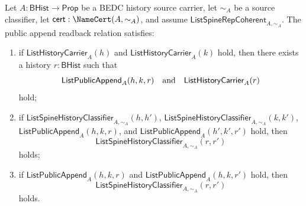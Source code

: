 \begin{theorem}
\label{thm:list-public-append-readback-total-congruent}
Let $A:\mathsf{BHist}\to\mathsf{Prop}$ be a BEDC history source carrier, let
$\sim_A$ be a source classifier, let $\mathsf{cert}:\NameCert(A,\sim_A)$, and
assume $\mathsf{ListSpineRepCoherent}_{A,\sim_A}$. The public append readback
relation satisfies:
\begin{enumerate}
  \item if $\mathsf{ListHistoryCarrier}_A(h)$ and
  $\mathsf{ListHistoryCarrier}_A(k)$ hold, then there exists a history
  $r:\mathsf{BHist}$ such that
  $$
  \mathsf{ListPublicAppend}_A(h,k,r)
  \quad\hbox{and}\quad
  \mathsf{ListHistoryCarrier}_A(r)
  $$
  hold;
  \item if
  $\mathsf{ListSpineHistoryClassifier}_{A,\sim_A}(h,h')$,
  $\mathsf{ListSpineHistoryClassifier}_{A,\sim_A}(k,k')$,
  $\mathsf{ListPublicAppend}_A(h,k,r)$, and
  $\mathsf{ListPublicAppend}_A(h',k',r')$ hold, then
  $$
  \mathsf{ListSpineHistoryClassifier}_{A,\sim_A}(r,r')
  $$
  holds;
  \item if $\mathsf{ListPublicAppend}_A(h,k,r)$ and
  $\mathsf{ListPublicAppend}_A(h,k,r')$ hold, then
  $$
  \mathsf{ListSpineHistoryClassifier}_{A,\sim_A}(r,r')
  $$
  holds.
\end{enumerate}
\end{theorem}
